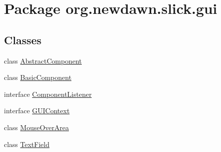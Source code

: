 \hypertarget{namespaceorg_1_1newdawn_1_1slick_1_1gui}{}\section{Package org.\+newdawn.\+slick.\+gui}
\label{namespaceorg_1_1newdawn_1_1slick_1_1gui}
\subsection*{Classes}
\begin{DoxyCompactItemize}
\item 
class \mbox{\hyperlink{classorg_1_1newdawn_1_1slick_1_1gui_1_1_abstract_component}{Abstract\+Component}}
\item 
class \mbox{\hyperlink{classorg_1_1newdawn_1_1slick_1_1gui_1_1_basic_component}{Basic\+Component}}
\item 
interface \mbox{\hyperlink{interfaceorg_1_1newdawn_1_1slick_1_1gui_1_1_component_listener}{Component\+Listener}}
\item 
interface \mbox{\hyperlink{interfaceorg_1_1newdawn_1_1slick_1_1gui_1_1_g_u_i_context}{G\+U\+I\+Context}}
\item 
class \mbox{\hyperlink{classorg_1_1newdawn_1_1slick_1_1gui_1_1_mouse_over_area}{Mouse\+Over\+Area}}
\item 
class \mbox{\hyperlink{classorg_1_1newdawn_1_1slick_1_1gui_1_1_text_field}{Text\+Field}}
\end{DoxyCompactItemize}
